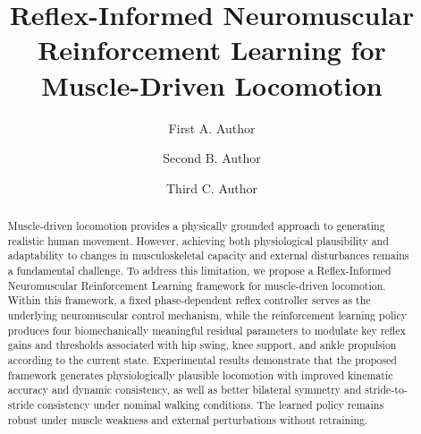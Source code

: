 \documentclass[acmtog,screen]{acmart}
\begin{document}
\raggedbottom
\title{
Reflex-Informed Neuromuscular Reinforcement Learning for Muscle-Driven Locomotion
}
\author{First A. Author}
\author{Second B. Author}
\author{Third C. Author}

\begin{abstract}

Muscle-driven locomotion provides a physically grounded approach to generating realistic human movement. However, achieving both physiological plausibility and adaptability to changes in musculoskeletal capacity and external disturbances remains a fundamental challenge. To address this limitation, we propose a Reflex-Informed Neuromuscular Reinforcement Learning framework for muscle-driven locomotion. Within this framework, a fixed phase-dependent reflex controller serves as the underlying neuromuscular control mechanism, while the reinforcement learning policy produces four biomechanically meaningful residual parameters to modulate key reflex gains and thresholds associated with hip swing, knee support, and ankle propulsion according to the current state. Experimental results demonstrate that the proposed framework generates physiologically plausible locomotion with improved kinematic accuracy and dynamic consistency, as well as better bilateral symmetry and stride-to-stride consistency under nominal walking conditions. The learned policy remains robust under muscle weakness and external perturbations without retraining.


\end{abstract}
\end{document}
